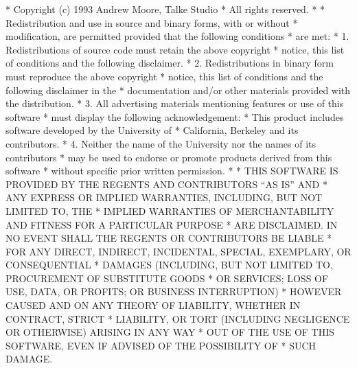 \begin{copyrightEnv}
 * Copyright (c) 1993 Andrew Moore, Talke Studio
 * All rights reserved.
 *
 * Redistribution and use in source and binary forms, with or without
 * modification, are permitted provided that the following conditions
 * are met:
 * 1. Redistributions of source code must retain the above copyright
 *    notice, this list of conditions and the following disclaimer.
 * 2. Redistributions in binary form must reproduce the above copyright
 *    notice, this list of conditions and the following disclaimer in the
 *    documentation and/or other materials provided with the distribution.
 * 3. All advertising materials mentioning features or use of this software
 *    must display the following acknowledgement:
 *      This product includes software developed by the University of
 *      California, Berkeley and its contributors.
 * 4. Neither the name of the University nor the names of its contributors
 *    may be used to endorse or promote products derived from this software
 *    without specific prior written permission.
 *
 * THIS SOFTWARE IS PROVIDED BY THE REGENTS AND CONTRIBUTORS ``AS IS'' AND
 * ANY EXPRESS OR IMPLIED WARRANTIES, INCLUDING, BUT NOT LIMITED TO, THE
 * IMPLIED WARRANTIES OF MERCHANTABILITY AND FITNESS FOR A PARTICULAR PURPOSE
 * ARE DISCLAIMED.  IN NO EVENT SHALL THE REGENTS OR CONTRIBUTORS BE LIABLE
 * FOR ANY DIRECT, INDIRECT, INCIDENTAL, SPECIAL, EXEMPLARY, OR CONSEQUENTIAL
 * DAMAGES (INCLUDING, BUT NOT LIMITED TO, PROCUREMENT OF SUBSTITUTE GOODS
 * OR SERVICES; LOSS OF USE, DATA, OR PROFITS; OR BUSINESS INTERRUPTION)
 * HOWEVER CAUSED AND ON ANY THEORY OF LIABILITY, WHETHER IN CONTRACT, STRICT
 * LIABILITY, OR TORT (INCLUDING NEGLIGENCE OR OTHERWISE) ARISING IN ANY WAY
 * OUT OF THE USE OF THIS SOFTWARE, EVEN IF ADVISED OF THE POSSIBILITY OF
 * SUCH DAMAGE.
\end{copyrightEnv}

